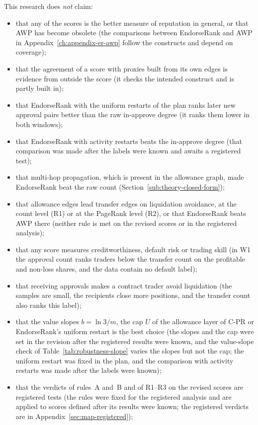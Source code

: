 This research does \emph{not} claim:

\begin{itemize}
\item that any of the scores is the better measure of reputation in general, or that AWP has become obsolete (the comparisons between EndorseRank and AWP in Appendix~\ref{ch:appendix-er-awp} follow the constructs and depend on coverage);
\item that the agreement of a score with proxies built from its own edges is evidence from outside the score (it checks the intended construct and is partly built in);
\item that EndorseRank with the uniform restarts of the plan ranks later new approval pairs better than the raw in-approve degree (it ranks them lower in both windows);
\item that EndorseRank with activity restarts beats the in-approve degree (that comparison was made after the labels were known and awaits a registered test);
\item that multi-hop propagation, which is present in the allowance graph, made EndorseRank beat the raw count (Section~\ref{sub:theory-closed-form});
\item that allowance edges lead transfer edges on liquidation avoidance, at the count level (R1) or at the PageRank level (R2), or that EndorseRank beats AWP there (neither rule is met on the revised scores or in the registered analysis);
\item that any score measures creditworthiness, default risk or trading skill (in W1 the approval count ranks traders below the transfer count on the profitable and non-loss shares, and the data contain no default label);
\item that receiving approvals makes a contract trader avoid liquidation (the samples are small, the recipients close more positions, and the transfer count also ranks this label);
\item that the value slopes $b=\ln 3/m$, the cap $U$ of the allowance layer of C-PR or EndorseRank's uniform restart is the best choice (the slopes and the cap were set in the revision after the registered results were known, and the value-slope check of Table~\ref{tab:robustness-slope} varies the slopes but not the cap; the uniform restart was fixed in the plan, and the comparison with activity restarts was made after the labels were known);
\item that the verdicts of rules~A and~B and of R1--R3 on the revised scores are registered tests (the rules were fixed for the registered analysis and are applied to scores defined after its results were known; the registered verdicts are in Appendix~\ref{sec:map-registered});

\end{itemize}
